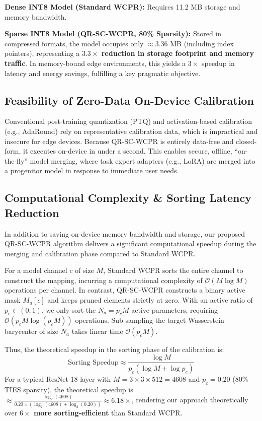 \documentclass{article}
\theoremstyle{plain}
\theoremstyle{definition}
\theoremstyle{remark}
\begin{document}
\textbf{Dense INT8 Model (Standard WCPR):} Requires 11.2 MB storage and memory bandwidth.

\textbf{Sparse INT8 Model (QR-SC-WCPR, 80\% Sparsity):} Stored in compressed formats, the model occupies only $\approx$3.36 MB (including index pointers), representing a \textbf{$3.3\times$ reduction in storage footprint and memory traffic}. In memory-bound edge environments, this yields a $3\times$ speedup in latency and energy savings, fulfilling a key pragmatic objective.

\subsection{Feasibility of Zero-Data On-Device Calibration}
Conventional post-training quantization (PTQ) and activation-based calibration (e.g., AdaRound) rely on representative calibration data, which is impractical and insecure for edge devices. Because QR-SC-WCPR is entirely data-free and closed-form, it executes on-device in under a second. This enables secure, offline, ``on-the-fly'' model merging, where task expert adapters (e.g., LoRA) are merged into a progenitor model in response to immediate user needs.

\subsection{Computational Complexity \& Sorting Latency Reduction}
\label{subsec:complexity}
In addition to saving on-device memory bandwidth and storage, our proposed QR-SC-WCPR algorithm delivers a significant computational speedup during the merging and calibration phase compared to Standard WCPR.

For a model channel $c$ of size $M$, Standard WCPR sorts the entire channel to construct the mapping, incurring a computational complexity of $\mathcal{O}(M \log M)$ operations per channel. In contrast, QR-SC-WCPR constructs a binary active mask $M_a[c]$ and keeps pruned elements strictly at zero. With an active ratio of $p_c \in (0, 1)$, we only sort the $N_a = p_c M$ active parameters, requiring $\mathcal{O}(p_c M \log (p_c M))$ operations. Sub-sampling the target Wasserstein barycenter of size $N_a$ takes linear time $\mathcal{O}(p_c M)$. 

Thus, the theoretical speedup in the sorting phase of the calibration is:
\begin{equation}
    \text{Sorting Speedup} \approx \frac{\log M}{p_c (\log M + \log p_c)}
\end{equation}
For a typical ResNet-18 layer with $M = 3 \times 3 \times 512 = 4608$ and $p_c = 0.20$ (80\% TIES sparsity), the theoretical speedup is $\approx \frac{\log_2(4608)}{0.20 \times (\log_2(4608) + \log_2(0.20))} \approx 6.18\times$, rendering our approach theoretically over \textbf{$6\times$ more sorting-efficient} than Standard WCPR.
\end{document}
